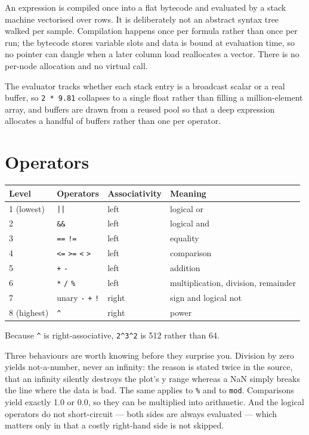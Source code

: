 \documentclass[11pt,a4paper,oneside]{report}
\newcommand{\code}[1]{\texttt{#1}}
\begin{document}
An expression is compiled once into a flat bytecode and evaluated by a stack
machine vectorised over rows. It is deliberately not an abstract syntax tree
walked per sample. Compilation happens once per formula rather than once per run;
the bytecode stores variable slots and data is bound at evaluation time, so no
pointer can dangle when a later column load reallocates a vector. There is no
per-node allocation and no virtual call.

The evaluator tracks whether each stack entry is a broadcast scalar or a real
buffer, so \code{2 * 9.81} collapses to a single float rather than filling a
million-element array, and buffers are drawn from a reused pool so that a deep
expression allocates a handful of buffers rather than one per operator.

\section{Operators}

\begin{center}
\small
\begin{tabular}{@{}llll@{}}
\toprule
\textbf{Level} & \textbf{Operators} & \textbf{Associativity} & \textbf{Meaning} \\
\midrule
1 (lowest) & \code{||} & left & logical or \\
2 & \code{\&\&} & left & logical and \\
3 & \code{==} \code{!=} & left & equality \\
4 & \code{<=} \code{>=} \code{<} \code{>} & left & comparison \\
5 & \code{+} \code{-} & left & addition \\
6 & \code{*} \code{/} \code{\%} & left & multiplication, division, remainder \\
7 & unary \code{-} \code{+} \code{!} & right & sign and logical not \\
8 (highest) & \code{\textasciicircum} & right & power \\
\bottomrule
\end{tabular}
\end{center}

Because \code{\textasciicircum} is right-associative,
\code{2\textasciicircum3\textasciicircum2} is 512 rather than 64.

Three behaviours are worth knowing before they surprise you. Division by zero
yields not-a-number, never an infinity: the reason is stated twice in the source,
that an infinity silently destroys the plot's y range whereas a NaN simply breaks
the line where the data is bad. The same applies to \code{\%} and to \code{mod}.
Comparisons yield exactly 1.0 or 0.0, so they can be multiplied into arithmetic.
And the logical operators do not short-circuit --- both sides are always
evaluated --- which matters only in that a costly right-hand side is not skipped.
\end{document}
